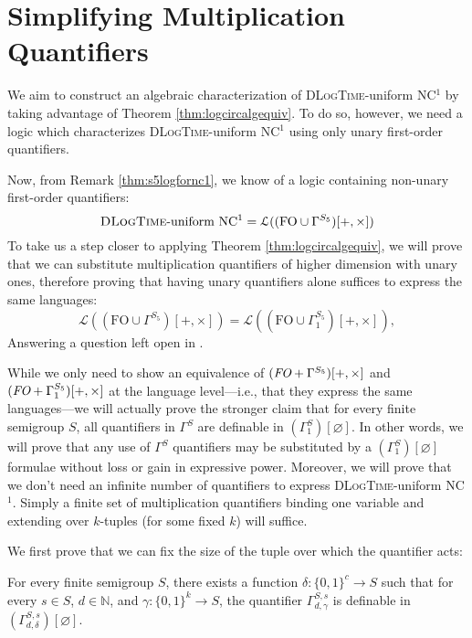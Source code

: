 \documentclass[a4paper,UKenglish,cleveref, autoref, thm-restate, anonymous]{lipics-v2021}
\begin{document}
\section{Simplifying Multiplication Quantifiers}\label{sec:mult}


We aim to construct an algebraic characterization of \textsc{DLogTime}-uniform NC${}^1$ by taking advantage of Theorem \ref{thm:logcircalgequiv}. To do so, however, we need a logic which characterizes \textsc{DLogTime}-uniform NC${}^1$ using only unary first-order quantifiers.

Now, from Remark \ref{thm:s5logfornc1}, we know of a logic containing non-unary first-order quantifiers:
\begin{equation*}\label{eq:foo1}
    \text{\textsc{DLogTime}-uniform NC${}^1$} = \mathcal{L}((\text{FO} \cup \Gamma^{S_5})[+,\times])
\end{equation*} To take us a step closer to applying Theorem \ref{thm:logcircalgequiv}, we will prove that we can substitute multiplication quantifiers of higher dimension with unary ones, therefore proving that having unary quantifiers alone suffices to express the same languages: \[
    \mathcal{L}((\text{FO} \cup \Gamma^{S_5})[+,\times]) = \mathcal{L}((\text{FO} \cup \Gamma^{S_5}_1)[+,\times]),
\] Answering a question left open in \cite{lautemann2001descriptive}.

While we only need to show an equivalence of $(\emph{FO} + \Gamma^{S_5})[+,\times]$ and $(\emph{FO} + \Gamma^{S_5}_1)[+,\times]$ at the language level---i.e., that they express the same languages---we will actually prove the stronger claim that for every finite semigroup $S$, all quantifiers in $\Gamma^{S}$ are definable in $(\Gamma^S_1)[\varnothing]$. In other words, we will prove that any use of $\Gamma^{S}$ quantifiers may be substituted by a $(\Gamma^S_1)[\varnothing]$ formulae without loss or gain in expressive power. Moreover, we will prove that we don't need an infinite number of quantifiers to express \textsc{DLogTime}-uniform NC${}^1$. Simply a finite set of multiplication quantifiers binding one variable and extending over $k$-tuples (for some fixed $k$) will suffice.

We first prove that we can fix the size of the tuple over which the quantifier acts:


\begin{lemma}\label{lem:finitetuple}
    For every finite semigroup $S$, there exists a function $\delta : \{0,1\}^c \rightarrow S$ such that for every $s \in S$, $d \in \mathbb{N}$, and $\gamma : \{0,1\}^k \rightarrow S$, the quantifier $\Gamma^{S,s}_{d,\gamma}$ is definable in $(\Gamma^{S,s}_{d,\delta})[\varnothing]$.
\end{lemma}
\end{document}
